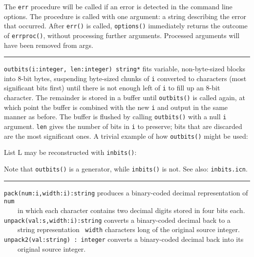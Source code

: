 The \texttt{err} procedure will be called if an error is detected in the
command line options. The procedure is called with one argument: a
string describing the error that occurred. After \texttt{err()} is
called, \texttt{options()} immediately returns the outcome of
\texttt{errproc()}, without processing further arguments.
Processed arguments will have been removed from args.

\vspace{0.25cm}\hrule{}

\texttt{outbits(i:integer, len:integer) string*} fits variable,
non-byte-sized blocks into 8-bit bytes,
suspending byte-sized chunks of \texttt{i} converted to characters
(most significant bits first) until there is not enough left of
\texttt{i} to fill up an 8-bit character. The remainder is
stored in a buffer until \texttt{outbits()} is called again, at which
point the buffer is combined with the new \texttt{i} and output in
the same manner as before. The buffer is flushed by calling
\texttt{outbits()} with a null \texttt{i} argument. 
\texttt{len} gives the number of bits in \texttt{i} to preserve;
bits that are discarded are the most significant ones. A trivial
example of how \texttt{outbits()} might be used:


\noindent List L may be reconstructed with \texttt{inbits()}:


\noindent Note that \texttt{outbits()} is a generator, while
\texttt{inbits()} is not.
See also: \texttt{inbits.icn}.

\vspace{0.25cm}\hrule{}

\texttt{pack(num:i,width:i):string} produces a binary-coded decimal
representation of \texttt{num}\\
 \ \ \ \  in which each character contains two decimal
digits stored in four bits each.\\
\texttt{unpack(val:s,width:i):string} converts a binary-coded decimal
back to a\\
 \ \ \ \ string representation \ \texttt{width} characters long of the
original source integer.\\
\texttt{unpack2(val:string) : integer} converts a binary-coded decimal
back into its\\
 \ \ \ \ original source integer.

